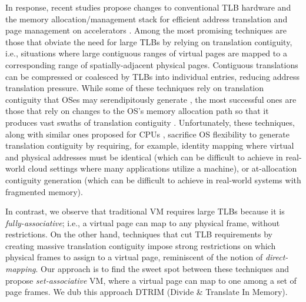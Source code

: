 In response, recent studies propose changes to conventional TLB
hardware and the memory allocation/management stack for efficient
address translation and page management on accelerators
\cite{pichai:architectural, power:supporting,
  ausavarungnirun:mosaic}. Among the most promising techniques are
those that obviate the need for large TLBs by relying on translation
contiguity, i.e., situations where large contiguous ranges of virtual
pages are mapped to a corresponding range of spatially-adjacent
physical pages. Contiguous translations can be compressed or coalesced
by TLBs into individual entries, reducing address translation
pressure. While some of these techniques rely on translation
contiguity that OSes may serendipitously generate \cite{pham:colt,
  bhattacharjee:large-reach, cox:efficient, pham:increasing}, the most
successful ones are those that rely on changes to the OS's memory
allocation path so that it produces vast swaths of translation
contiguity \cite{haria:devirtualizing}. Unfortunately, these
techniques, along with similar ones proposed for CPUs
\cite{basu:efficient, gandhi:range}, sacrifice OS flexibility to
generate translation contiguity by requiring, for example, identity
mapping where virtual and physical addresses must be identical (which
can be difficult to achieve in real-world cloud settings where many
applications utilize a machine), or at-allocation contiguity
generation (which can be difficult to achieve in real-world systems
with fragmented memory). %

In contrast, we observe that traditional VM requires large
TLBs because it is {\it fully-associative}; i.e., a virtual page can
map to any physical frame, without restrictions. On the other hand, techniques that cut TLB
requirements by creating massive translation contiguity
\cite{basu:efficient, gandhi:range, haria:devirtualizing} impose
strong restrictions on which physical frames to assign to a virtual
page, reminiscent of the notion of {\it direct-mapping}. Our approach
is to find the sweet spot between these techniques and propose {\it
  set-associative} VM, where a virtual page can map to one among a set
of page frames. We dub this approach DTRIM (Divide & Translate In Memory). 

